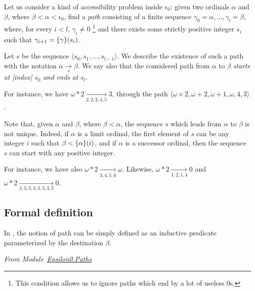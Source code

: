Let us consider a kind of accessibility problem inside $\epsilon_0$: given two ordinals $\alpha$ and $\beta$, where $\beta<\alpha<\epsilon_0$, find a \emph{path} consisting of a finite sequence $\gamma_0=\alpha,\dots,\gamma_l=\beta$,
where, for every $i<l$, $\gamma_i \not= 0$ \footnote{This condition allows us to ignore paths which end by a lot of useless $0$s.} and there exists some strictly positive integer $s_i$
such that $\gamma_{i+1}=\mbox{$\{\gamma\}(s_i)$}$.

Let $s$ be the sequence $\langle s_0,s_1,\dots, s_{l-1} \rangle$. We describe the
existence of such a path with the notation $\alpha\xrightarrow [s]{}\beta$.
We say also that the considered path from $\alpha$ to $\beta$ \emph{starts at [index] $s_0$ and ends at $s_l$}.

For instance, we have $\omega*2 \xrightarrow[2,2,2,4,5]{}3$, through the 
path $\langle\omega\times 2, \omega+2,\omega+1,\omega,4,3\rangle$.


\begin{remark}
  

Note that, given $\alpha$ and $\beta$, where $\beta < \alpha$, the sequence $s$ which leads from $\alpha$ to $\beta$ is not unique.
Indeed, if $\alpha$ is a limit ordinal, the first element of $s$ can be any integer $i$ such that $\beta<\mbox{$\{\alpha\}(i)$}$, and if $\alpha$ is a successor ordinal,
then the sequence $s$ can start with any positive integer.


For instance, we have also 
$\omega*2 \xrightarrow[3,4,5,6]{}\omega$. 
Likewise,
$\omega*2 \xrightarrow[1,2,1,4]{} 0$ and
$\omega*2 \xrightarrow[3,3,3,3,3,3,3,3]{} 0$.
\end{remark}

\subsection{Formal definition}

\label{path-to-definition}

In \coq{}, the notion of path can be simply defined as an inductive predicate 
parameterized by the destination $\beta$.

\vspace{4pt}
\emph{From Module~\href{../theories/html/hydras.Epsilon0.Paths.html}{Epsilon0.Paths}}

\label{sect:path-to-def}




